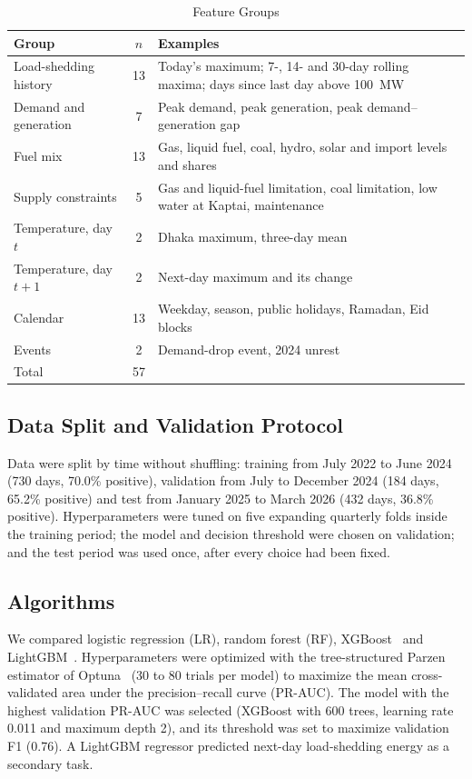 \documentclass[conference]{IEEEtran}
\begin{document}
\begin{table}[!t]
\caption{Feature Groups}
\label{tab:features}
\centering
\footnotesize
\begin{tabular}{@{}L{2.2cm}cL{4.6cm}@{}}
\toprule
Group & $n$ & Examples \\
\midrule
Load-shedding history & 13 & Today's maximum; 7-, 14- and 30-day rolling maxima; days since last day above 100~MW \\
Demand and generation & 7 & Peak demand, peak generation, peak demand--generation gap \\
Fuel mix & 13 & Gas, liquid fuel, coal, hydro, solar and import levels and shares \\
Supply constraints & 5 & Gas and liquid-fuel limitation, coal limitation, low water at Kaptai, maintenance \\
Temperature, day $t$ & 2 & Dhaka maximum, three-day mean \\
Temperature, day $t+1$ & 2 & Next-day maximum and its change \\
Calendar & 13 & Weekday, season, public holidays, Ramadan, Eid blocks \\
Events & 2 & Demand-drop event, 2024 unrest \\
\midrule
Total & 57 & \\
\bottomrule
\end{tabular}
\end{table}

\subsection{Data Split and Validation Protocol}
Data were split by time without shuffling: training from July 2022 to June 2024 (730 days, 70.0\% positive), validation from July to December 2024 (184 days, 65.2\% positive) and test from January 2025 to March 2026 (432 days, 36.8\% positive). Hyperparameters were tuned on five expanding quarterly folds inside the training period; the model and decision threshold were chosen on validation; and the test period was used once, after every choice had been fixed.

\subsection{Algorithms}
We compared logistic regression (LR), random forest (RF), XGBoost~\cite{chen2016} and LightGBM~\cite{ke2017}. Hyperparameters were optimized with the tree-structured Parzen estimator of Optuna~\cite{akiba2019} (30 to 80 trials per model) to maximize the mean cross-validated area under the precision--recall curve (PR-AUC). The model with the highest validation PR-AUC was selected (XGBoost with 600 trees, learning rate 0.011 and maximum depth 2), and its threshold was set to maximize validation F1 (0.76). A LightGBM regressor predicted next-day load-shedding energy as a secondary task.
\end{document}
